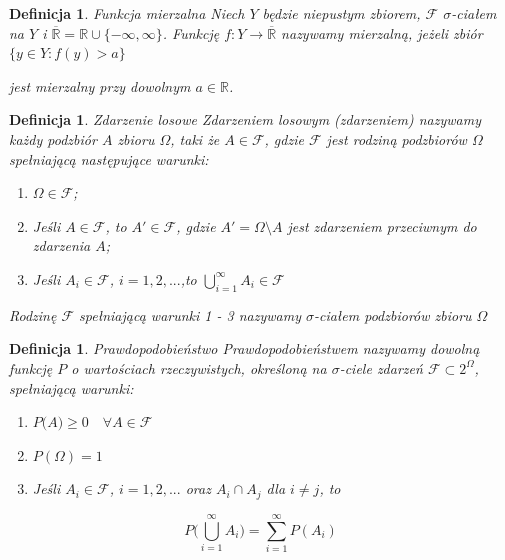 \documentclass[12pt,a4paper]{report}
\newtheorem{definition}[theorem]{Definicja}
\begin{document}
\begin{definition}{Funkcja mierzalna \cite[w oparciu o rozdział 8.2]{rudnicki2006}}
Niech $Y$ będzie niepustym zbiorem, $\mathcal{F}$  $\sigma$-ciałem na $Y$ i $\overline{\mathbb{R}} = \mathbb{R} \cup \{-\infty, \infty \}$. Funkcję $f: Y \rightarrow \overline{\mathbb{R}}$ nazywamy mierzalną, jeżeli zbiór
$\{ y \in Y: f(y) > a \}$

jest mierzalny przy dowolnym $a \in \mathbb{R}$.
\end{definition}


\begin{definition}{Zdarzenie losowe \cite[w oparciu o rozdział 1.1]{krysicki1999}}
Zdarzeniem losowym (zdarzeniem) nazywamy każdy podzbiór $\textit{A}$ zbioru $\Omega$, taki że  $A \in \mathcal{F}$, gdzie $\mathcal{F}$ jest rodziną podzbiorów $\Omega$ spełniającą następujące warunki:
\begin{enumerate}
\item $\Omega \in \mathcal{F}$;
\item Jeśli $A \in \mathcal{F}$, to $\textit{A$'$} \in \mathcal{F}$, gdzie $\textit{A$'$} = \Omega \setminus A $ jest zdarzeniem przeciwnym do zdarzenia $\textit{A}$;
\item Jeśli $\textit{A}_{i} \in \mathcal{F}$, $i= 1, 2, ...$,to $\bigcup\limits_{i=1}^{\infty} A_{i} \in \mathcal{F} $
\end{enumerate}
Rodzinę $\mathcal{F}$ spełniającą warunki 1 - 3 nazywamy $\sigma$-ciałem podzbiorów zbioru $\Omega$
\end{definition}


\begin{definition}{Prawdopodobieństwo \cite[w oparciu o rozdział 1.1]{krysicki1999}}
Prawdopodobieństwem nazywamy dowolną funkcję $P$ o wartościach rzeczywistych, określoną na $\sigma$-ciele zdarzeń $\mathcal{F} \subset 2^\Omega$, spełniającą warunki: \\
\begin{enumerate}
\item $\textit{P(A)} \geq 0 \quad \forall{\textit{A} \in \mathcal{F}}$
\item $\textit{P}(\Omega) = 1$
\item Jeśli $\textit{A}_{i} \in \mathcal{F}$, $i= 1, 2, ...$ oraz $A_{i} \cap A_{j}$ dla $i \neq j$, to 
\end{enumerate}

$$P \Big(\bigcup\limits_{i=1}^{\infty} A_{i} \Big)=\sum_{i=1}^{\infty} P(A_{i}) $$

\end{definition}
\end{document}
